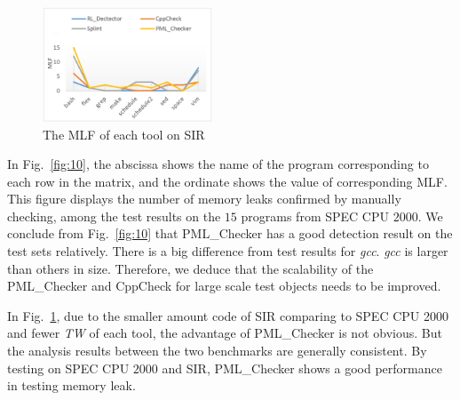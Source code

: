 \begin{figure}[!h]
\center
\includegraphics[width=0.45\textwidth]{figure/fig8-fig12/fig11}
\caption{The MLF of each tool on SIR}
\label{fig:11}
\end{figure}

In Fig.~\ref{fig:10}, the abscissa shows the name of the program corresponding to each row in the matrix, and the ordinate shows the value of corresponding MLF. This figure displays the number of memory leaks confirmed by manually checking, among the test results on the $15$ programs from SPEC CPU $2000$. We conclude from Fig.~\ref{fig:10} that PML\_Checker has a good detection result on the test sets relatively. There is a big difference from test results for \textit{gcc}. \textit{gcc} is larger than others in size. Therefore, we deduce that the scalability of the PML\_Checker and CppCheck for large scale test objects needs to be improved. 

In Fig.~\ref{fig:11}, due to the smaller amount code of SIR comparing to SPEC CPU 2000 and fewer \textit{TW} of each tool, the advantage of PML\_Checker is not obvious. But the analysis results between the two benchmarks are generally consistent. By testing on SPEC CPU $2000$ and SIR, PML\_Checker shows a good performance in testing memory leak.

